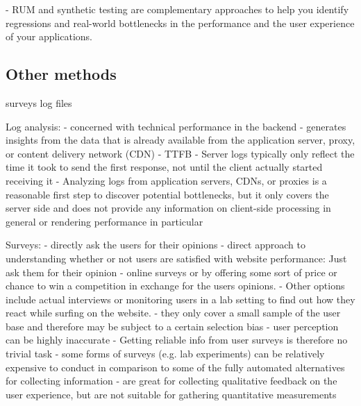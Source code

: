 
- RUM and synthetic testing are complementary approaches to help you identify regressions and real-world bottlenecks in the performance and the user experience of your applications.









\subsection{Other methods}

surveys
log files




Log analysis:
- concerned with technical performance in the backend
- generates insights from the data that is already available from the application server, proxy, or content delivery network (CDN)
- TTFB
- Server logs typically only reflect the time it took to send the first response, not until the client actually started receiving it
- Analyzing logs from application servers, CDNs, or proxies is a reasonable first step to discover potential bottlenecks, but it only covers the server side and does not provide any information on client-side processing in general or rendering performance in particular


Surveys:
- directly ask the users for their opinions
- direct approach to understanding whether or not users are satisfied with website performance: Just ask them for their opinion
- online surveys or by offering some sort of price or chance to win a competition in exchange for the users opinions. 
- Other options include actual interviews or monitoring users in a lab setting to find out how they react while surfing on the website.
- they only cover a small sample of the user base and therefore may be subject to a certain selection bias
- user perception can be highly inaccurate
- Getting reliable info from user surveys is therefore no trivial task
- some forms of surveys (e.g. lab experiments) can be relatively expensive to conduct in comparison to some of the fully automated alternatives for collecting information
- are great for collecting qualitative feedback on the user experience, but are not suitable for gathering quantitative measurements





